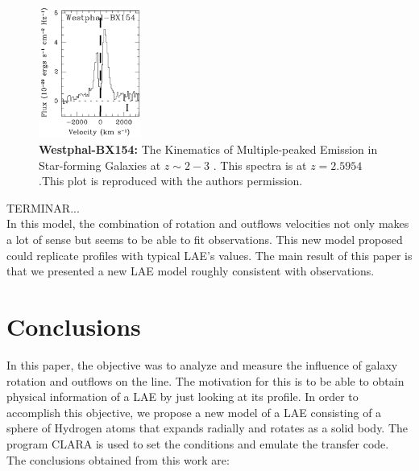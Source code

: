 \documentclass[twocolappendix]{latex/emulateapj}
\begin{document}
\begin{figure}[h!]
	\begin{center}
		\includegraphics[width=0.3\textwidth]{./figures/kulas_w}
	\end{center}
	\caption{\textbf{Westphal-BX154:} The Kinematics of Multiple-peaked \lya Emission in Star-forming Galaxies at $z\sim2-3$ \cite{Kulas12}. This spectra is at $z=2.5954$.This plot is reproduced with the authors permission.
		\label{fig:kulas_w}}
\end{figure}

TERMINAR...\\

In this model, the combination of rotation and outflows velocities not only makes a lot of sense but seems to be able to fit observations. This new model proposed could replicate \lya profiles with typical LAE's values. The main result of this paper is that we presented a new LAE model roughly consistent with observations.\\


\section{Conclusions}
\label{sec:conclusions}

In this paper, the objective was to analyze and measure the influence of galaxy rotation and outflows on the \lya line. The motivation for this is to be able to obtain physical information of a LAE by just looking at its \lya profile. In order to accomplish this objective, we propose a new model of a LAE consisting of a sphere of Hydrogen atoms that expands radially and rotates as a solid body. The program CLARA \cite{CLARA} is used to set the conditions and emulate the transfer code. \\

The conclusions obtained from this work are: \\
\end{document}
